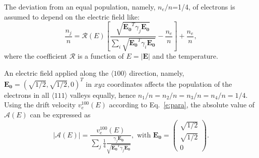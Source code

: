 \documentclass[epj]{svjour}
\begin{document}
The deviation from an equal population, namely, $n_{e}/n$=1/4, of
electrons is assumed to depend on the electric field like:
\begin{equation} 
\label{e:nion} 
\frac{n_{j}}{n} = \mathcal{R}(E) 
\left[ \frac{\sqrt{\mathbf{E_{0}}^{T}\gamma_{j}\mathbf{E_{0}}}}
{\sum_{i}\sqrt{\mathbf{E_{0}}^{T}\gamma_{i}\mathbf{E_{0}}}} - 
\frac{n_{e}}{n} \right] + \frac{n_{e}}{n},  
\end{equation} 
where the coefficient $\mathcal{R}$ is a function of $E=|\mathbf{E}|$
and the temperature.
 
An electric field applied along the $\langle 100 \rangle$ direction,
namely, $\mathbf{E_{0}} = (\sqrt{1/2}, \sqrt{1/2}, 0)^{T}$ in $xyz$
coordinates affects the population of the electrons in all $\langle
111 \rangle$ valleys equally, hence $n_{1}/n = n_{2}/n = n_{3}/n =
n_{4}/n = 1/4$. Using the drift velocity $v_{e}^{100}(E)$ according to
Eq.~\ref{e:para}, the absolute value of $\mathcal{A}(E)$ can be
expressed as
\begin{equation} 
\label{e:ae} 
|\mathcal{A}(E)| = \frac{v_{e}^{100}(E)}  
{\displaystyle \sum_{j} \frac{1}{4} \frac{\gamma_{j}\mathbf{E_{0}}}
{\sqrt{\mathbf{E_{0}}^{T}\gamma_{j}\mathbf{E_{0}}}}}, \mbox{ with } 
\mathbf{E_{0}} = \left( \begin{array}{c}  
\sqrt{1/2}\\\sqrt{1/2}\\0 \end{array} \right). 
\end{equation} 
 
\end{document}
